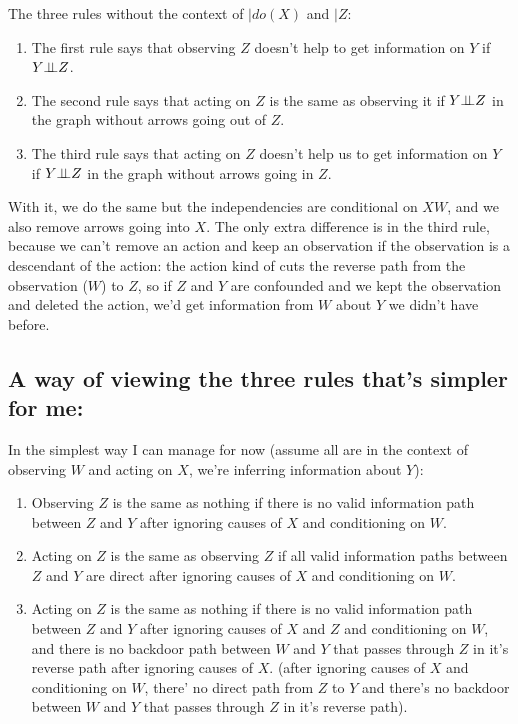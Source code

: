 The three rules without the context of $|do(X)$ and $|Z$:

\begin{enumerate}
\item The first rule says that observing $Z$ doesn't help to get information on $Y$ if $Y{\perp\!\!\!\perp} Z$.
\item The second rule says that acting on $Z$ is the same as observing it if $Y{\perp\!\!\!\perp} Z$ in the graph without arrows going out of $Z$.
\item The third rule says that acting on $Z$ doesn't help us to get information on $Y$ if $Y {\perp\!\!\!\perp} Z$ in the graph without arrows going in $Z$.
\end{enumerate}

With it, we do the same but the independencies are conditional on $XW$, and we also remove arrows going into $X$. The only extra difference is in the third rule, because we can't remove an action and keep an observation if the observation is a descendant of the action: the action kind of cuts the reverse path from the observation ($W$) to $Z$, so if $Z$ and $Y$ are confounded and we kept the observation and deleted the action, we'd get information from $W$ about $Y$ we didn't have before.

\subsection{A way of viewing the three rules that's simpler for me:}

In the simplest way I can manage for now (assume all are in the context of observing $W$ and acting on $X$, we're inferring information about $Y$):

\begin{enumerate}
\item Observing $Z$ is the same as nothing if there is no valid information path between $Z$ and $Y$ after ignoring causes of $X$ and conditioning on $W$.
\item Acting on $Z$ is the same as observing $Z$ if all valid information paths between $Z$ and $Y$ are direct after ignoring causes of $X$ and conditioning on $W$.
\item Acting on $Z$ is the same as nothing if there is no valid information path between $Z$ and $Y$ after ignoring causes of $X$ and $Z$ and conditioning on $W$, and there is no backdoor path between $W$ and $Y$ that passes through $Z$ in it's reverse path after ignoring causes of $X$. (after ignoring causes of $X$ and conditioning on $W$, there' no direct path from $Z$ to $Y$ and there's no backdoor between $W$ and $Y$ that passes through $Z$ in it's reverse path).
\end{enumerate}

